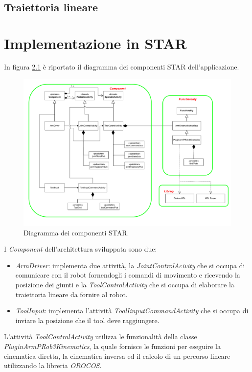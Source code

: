 \section{Traiettoria lineare}

\chapter{Implementazione in STAR} 

In figura \ref{fig:star_diagram} è riportato il diagramma dei componenti STAR dell'applicazione. 

\begin{figure}[tbh]
	\centering
	\includegraphics[width=1\linewidth]{./ImageFiles/publish_subscribe_architecture.drawio.pdf}
	\caption{Diagramma dei componenti STAR.}
	\label{fig:star_diagram}
\end{figure}

I \textit{Component} dell'architettura sviluppata sono due:
\begin{itemize}
	\item \textit{ArmDriver}: implementa due attività, la \textit{JointControlAcivity} che si occupa di comunicare con il robot fornendogli i comandi di movimento e ricevendo la posizione dei giunti e la \textit{ToolControlActivity} che si occupa di elaborare la traiettoria lineare da fornire al robot. 
	\item \textit{ToolInput}: implementa l'attività \textit{ToolIinputCommandActivity} che si occupa di inviare la posizione che il tool deve raggiungere.
\end{itemize}
\noindent
L'attività \textit{ToolControlActivity} utilizza le funzionalità della classe \textit{PluginArmPRob3Kinematics}, la quale fornisce le funzioni per eseguire la cinematica diretta, la cinematica inversa ed il calcolo di un percorso lineare utilizzando la libreria \textit{OROCOS}.



